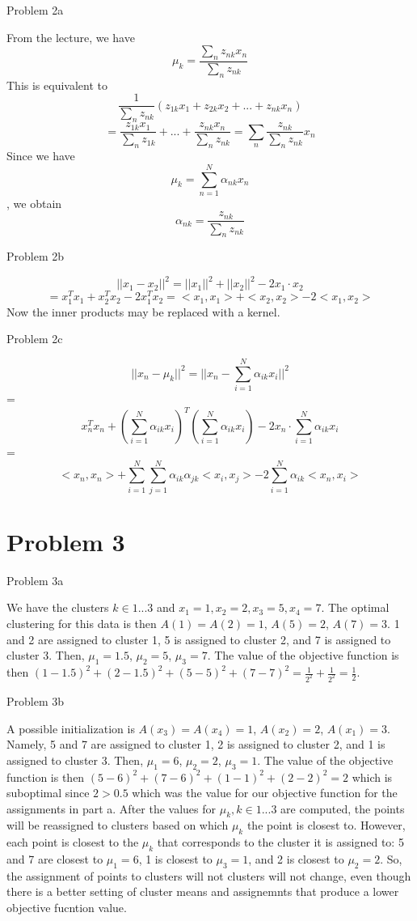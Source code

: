 \documentclass[11pt]{article}
\newcommand{\solution}[1]{{{\color{blue}{\bf Solution:} {#1}}}}
\begin{document}
\item Problem 2a

\solution{
From the lecture, we have \[\mu_k = \frac{\sum_n z_{nk}x_n}{\sum_n z_{nk}}\] This is equivalent to \[\frac{1}{\sum_n z_{nk}} (z_{1k}x_1 + z_{2k}x_2 + ... + z_{nk}x_n) \] \[ = \frac{z_{1k}x_1}{\sum_n z_{1k}} + ... + \frac{z_{nk}x_n}{\sum_n z_{nk}} = \sum_n \frac{z_{nk}}{\sum_n z_{nk}}x_n \] Since we have \[ \mu_k = \sum_{n=1}^{N} \alpha_{nk}x_n \], we obtain \[ \alpha_{nk} = \frac{z_{nk}}{\sum_n z_{nk}} \]
}
\item Problem 2b

\solution{
\[ || x_1 - x_2 ||^2 = ||x_1||^2 + ||x_2||^2 - 2 x_1 \cdot x_2 \] \[ = x_1^Tx_1 + x_2^Tx_2 - 2x_1^Tx_2 = <x_1, x_1> + <x_2, x_2> - 2<x_1, x_2> \]
Now the inner products may be replaced with a kernel.
}
\item Problem 2c

\solution{
\[ || x_n - \mu_k ||^2 = || x_n - \sum_{i=1}^{N} \alpha_{ik}x_i ||^2 \] = \[ x_n^Tx_n + (\sum_{i=1}^{N} \alpha_{ik}x_i)^T(\sum_{i=1}^{N} \alpha_{ik} x_i) - 2 x_n \cdot \sum_{i=1}^{N} \alpha_{ik}x_i \] = \[ <x_n, x_n> + \sum_{i=1}^{N} \sum_{j=1}^{N} \alpha_{ik}\alpha_{jk}<x_i, x_j> - 2 \sum_{i=1}^{N}\alpha_{ik}<x_n, x_i> \]
}

\newpage

\section{Problem 3}

\item Problem 3a

\solution{
We have the clusters $k \in 1...3$ and $x_1 = 1, x_2 = 2, x_3 = 5, x_4 = 7$. The optimal clustering for this data is then $A(1) = A(2) = 1$, $A(5) = 2$, $A(7) = 3$. 1 and 2 are assigned to cluster 1, 5 is assigned to cluster 2, and 7 is assigned to cluster 3. Then, $\mu_1 = 1.5$, $\mu_2 = 5$, $\mu_3 = 7$. The value of the objective function is then $(1-1.5)^2 + (2 - 1.5)^2 + (5-5)^2 + (7-7)^2 = \frac{1}{2^2} + \frac{1}{2^2} = \frac{1}{2}$. 
}

\item Problem 3b

\solution{
A possible initialization is $A(x_3) = A(x_4) = 1$, $A(x_2) = 2$, $A(x_1) = 3$. Namely, 5 and 7 are assigned to cluster 1, 2 is assigned to cluster 2, and 1 is assigned to cluster 3. Then, $\mu_1 = 6$, $\mu_2 = 2$, $\mu_3 = 1$. \newline{} The value of the objective function is then $(5-6)^2 + (7-6)^2 + (1-1)^2 + (2-2)^2 = 2$ which is suboptimal since $ 2 > 0.5 $ which was the value for our objective function for the assignments in part a. 
\newline{} After the values for $\mu_k, k \in 1...3$ are computed, the points will be reassigned to clusters based on which $\mu_k$ the point is closest to. However, each point is closest to the $\mu_k$ that corresponds to the cluster it is assigned to: 5 and 7 are closest to $\mu_1 = 6$, 1 is closest to $\mu_3 = 1$, and 2 is closest to $\mu_2 = 2$. So, the assignment of points to clusters will not clusters will not change, even though there is a better setting of cluster means and assignemnts that produce a lower objective fucntion value. 
}
\end{document}
